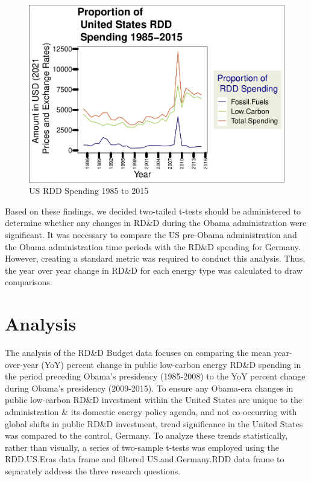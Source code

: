 \documentclass[
  12pt,
]{article}
\begin{document}
\begin{figure}
\centering
\includegraphics{Chang_Jenkins_Mullens_ENV872_Final_files/figure-latex/Line Plot of All US RDD-1.pdf}
\caption{US RDD Spending 1985 to 2015}
\end{figure}

Based on these findings, we decided two-tailed t-tests should be
administered to determine whether any changes in RD\&D during the Obama
administration were significant. It was necessary to compare the US
pre-Obama administration and the Obama administration time periods with
the RD\&D spending for Germany. However, creating a standard metric was
required to conduct this analysis. Thus, the year over year change in
RD\&D for each energy type was calculated to draw comparisons.

\newpage

\hypertarget{analysis}{%
\section{Analysis}\label{analysis}}

The analysis of the RD\&D Budget data focuses on comparing the mean
year-over-year (YoY) percent change in public low-carbon energy RD\&D
spending in the period preceding Obama's presidency (1985-2008) to the
YoY percent change during Obama's presidency (2009-2015). To ensure any
Obama-era changes in public low-carbon RD\&D investment within the
United States are unique to the administration \& its domestic energy
policy agenda, and not co-occurring with global shifts in public RD\&D
investment, trend significance in the United States was compared to the
control, Germany. To analyze these trends statistically, rather than
visually, a series of two-sample t-tests was employed using the
RDD.US.Eras data frame and filtered US.and.Germany.RDD data frame to
separately address the three research questions.
\end{document}
